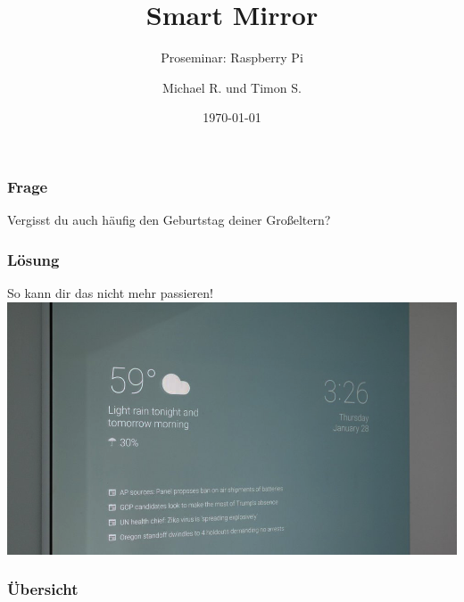 \documentclass[11pt]{beamer}
\begin{document}
	\author{Michael R. und Timon S.}
	\title{Smart Mirror}
	\subtitle{Proseminar: Raspberry Pi}
	\date{\today}
	
	\begin{frame}
		\titlepage
	\end{frame}

	\begin{frame}
		\frametitle{Frage}
		\huge
		\begin{center}
			\vfill
			Vergisst du auch h\"aufig den Geburtstag deiner Großeltern?
			\vfill
		\end{center}
	\end{frame}

	\begin{frame}
		\frametitle{L\"osung}
		\begin{center}
			\Large
			So kann dir das nicht mehr passieren!
			\includegraphics[width = .7\paperwidth]{images/showcaseImage}
		\end{center}
	\end{frame}

	\begin{frame}
		\frametitle{Übersicht}
		\tableofcontents
	\end{frame}
\end{document}
